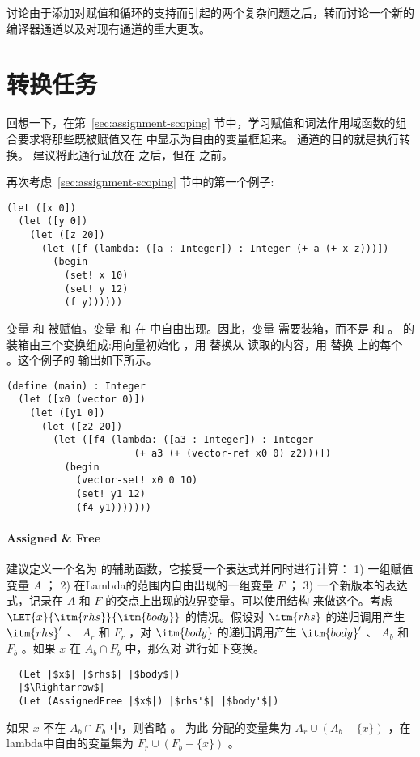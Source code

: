 \documentclass[11pt]{book}
\begin{document}
讨论由于添加对赋值和循环的支持而引起的两个复杂问题之后，转而讨论一个新的编译器通道以及对现有通道的重大更改。

\section{转换任务}
\label{sec:convert-assignments}

回想一下，在第~\ref{sec:assignment-scoping} 节中，学习赋值和词法作用域函数的组合要求将那些既被赋值又在  中显示为自由的变量框起来。
 通道的目的就是执行转换。
建议将此通行证放在  之后，但在 之前。

再次考虑~\ref{sec:assignment-scoping} 节中的第一个例子:
\begin{lstlisting}
(let ([x 0])
  (let ([y 0])
    (let ([z 20])
      (let ([f (lambda: ([a : Integer]) : Integer (+ a (+ x z)))])
        (begin
          (set! x 10)
          (set! y 12)
          (f y))))))
\end{lstlisting}

变量  和  被赋值。变量
 和  在  中自由出现。因此，变量  需要装箱，而不是  和 
。  的装箱由三个变换组成:用向量初始化
 ，用  替换从  读取的内容，用  替换  上的每个  。这个例子的  输出如下所示。
\begin{lstlisting}
(define (main) : Integer
  (let ([x0 (vector 0)])
    (let ([y1 0])
      (let ([z2 20])
        (let ([f4 (lambda: ([a3 : Integer]) : Integer
                      (+ a3 (+ (vector-ref x0 0) z2)))])
          (begin 
            (vector-set! x0 0 10)
            (set! y1 12)
            (f4 y1)))))))
\end{lstlisting}

\paragraph{Assigned \& Free}

建议定义一个名为
 的辅助函数，它接受一个表达式并同时进行计算： 1) 一组赋值变量 $A$ ； 2) 在Lambda的范围内自由出现的一组变量 $F$ ； 3) 一个新版本的表达式，记录在 $A$ 和 $F$ 的交点上出现的边界变量。可以使用结构
 来做这个。考虑
$\LET{x}{\itm{rhs}}{\itm{body}}$ 的情况。假设对
$\itm{rhs}$ 的递归调用产生 $\itm{rhs}'$ 、 $A_r$ 和 $F_r$ ，对 $\itm{body}$ 的递归调用产生 $\itm{body}'$ 、 $A_b$ 和 $F_b$ 。如果 $x$ 在 $A_b\cap F_b$ 中，那么对  进行如下变换。
\begin{lstlisting}
  (Let |$x$| |$rhs$| |$body$|)
  |$\Rightarrow$|
  (Let (AssignedFree |$x$|) |$rhs'$| |$body'$|)
\end{lstlisting}
如果 $x$ 不在 $A_b\cap F_b$ 中，则省略  。
为此  分配的变量集为 $A_r \cup (A_b - \{x\})$
，在lambda中自由的变量集为 $F_r \cup (F_b - \{x\})$ 。
\end{document}
